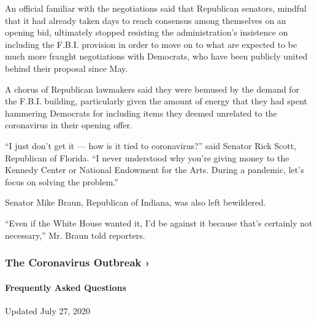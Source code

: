 An official familiar with the negotiations said that Republican
senators, mindful that it had already taken days to reach consensus
among themselves on an opening bid, ultimately stopped resisting the
administration's insistence on including the F.B.I. provision in order
to move on to what are expected to be much more fraught negotiations
with Democrats, who have been publicly united behind their proposal
since May.

A chorus of Republican lawmakers said they were bemused by the demand
for the F.B.I. building, particularly given the amount of energy that
they had spent hammering Democrats for including items they deemed
unrelated to the coronavirus in their opening offer.

``I just don't get it --- how is it tied to coronavirus?'' said Senator
Rick Scott, Republican of Florida. ``I never understood why you're
giving money to the Kennedy Center or National Endowment for the Arts.
During a pandemic, let's focus on solving the problem.''

Senator Mike Braun, Republican of Indiana, was also left bewildered.

``Even if the White House wanted it, I'd be against it because that's
certainly not necessary,'' Mr. Braun told reporters.

\href{https://www.nytimes.com/news-event/coronavirus?action=click\&pgtype=Article\&state=default\&region=MAIN_CONTENT_3\&context=storylines_faq}{}

\hypertarget{the-coronavirus-outbreak-}{%
\subsubsection{The Coronavirus Outbreak
›}\label{the-coronavirus-outbreak-}}

\hypertarget{frequently-asked-questions}{%
\paragraph{Frequently Asked
Questions}\label{frequently-asked-questions}}

Updated July 27, 2020


